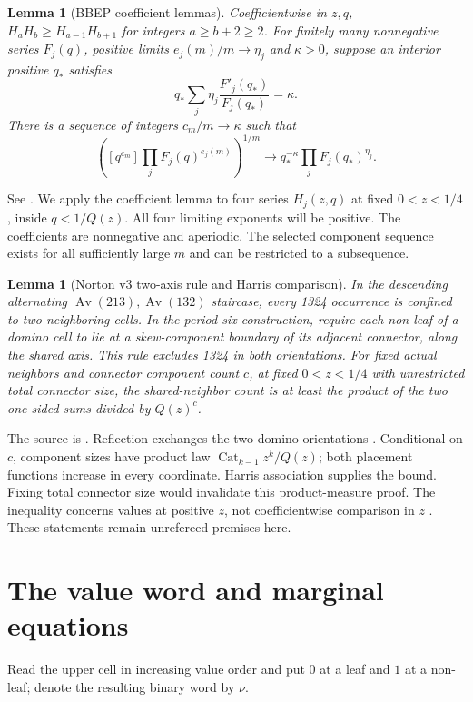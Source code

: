 \documentclass[11pt]{amsart}
\numberwithin{equation}{section}
\newtheorem{lemma}[theorem]{Lemma}
\theoremstyle{remark}\newtheorem{remark}[theorem]{Remark}
\newcommand{\Av}{\operatorname{Av}}
\newcommand{\Cat}{\operatorname{Cat}}
\begin{document}
\begin{lemma}[BBEP coefficient lemmas]\label{lem:coeff}
Coefficientwise in $z,q$, $H_aH_b\geq H_{a-1}H_{b+1}$ for integers $a\geq b+2\geq2$. For finitely many nonnegative series $F_j(q)$, positive limits $e_j(m)/m\to\eta_j$ and $\kappa>0$, suppose an interior positive $q_*$ satisfies
\[
 q_*\sum_j\eta_j\frac{F'_j(q_*)}{F_j(q_*)}=\kappa.
\]
There is a sequence of integers $c_m/m\to\kappa$ such that
\[
 \left([q^{c_m}]\prod_jF_j(q)^{e_j(m)}\right)^{1/m}
 \longrightarrow q_*^{-\kappa}\prod_jF_j(q_*)^{\eta_j}.
\]
\end{lemma}
See \cite[Propositions 7.2--7.3 and Lemma 7.4]{BBEP}. We apply the coefficient lemma to four series $H_j(z,q)$ at fixed $0<z<1/4$, inside $q<1/Q(z)$. All four limiting exponents will be positive. The coefficients are nonnegative and aperiodic. The selected component sequence exists for all sufficiently large $m$ and can be restricted to a subsequence.

\begin{lemma}[Norton v3 two-axis rule and Harris comparison]\label{lem:norton}
In the descending alternating $\Av(213),\Av(132)$ staircase, every 1324 occurrence is confined to two neighboring cells. In the period-six construction, require each non-leaf of a domino cell to lie at a skew-component boundary of its adjacent connector, along the shared axis. This rule excludes 1324 in both orientations. For fixed actual neighbors and connector component count $c$, at fixed $0<z<1/4$ with unrestricted total connector size, the shared-neighbor count is at least the product of the two one-sided sums divided by $Q(z)^c$.
\end{lemma}
The source is \cite[Lemmas 2.1--2.2, Lemmas 3.1 and 3.5, Corollary 3.3, Theorem 3.6]{N3}. Reflection exchanges the two domino orientations \cite[Lemma 4.3]{N3}. Conditional on $c$, component sizes have product law $\Cat_{k-1}z^k/Q(z)$; both placement functions increase in every coordinate. Harris association supplies the bound. Fixing total connector size would invalidate this product-measure proof. The inequality concerns values at positive $z$, not coefficientwise comparison in $z$ \cite[Remark 3.7]{N3}. These statements remain unrefereed premises here.

\section{The value word and marginal equations}
Read the upper cell in increasing value order and put $0$ at a leaf and $1$ at a non-leaf; denote the resulting binary word by $\nu$.
\end{document}
